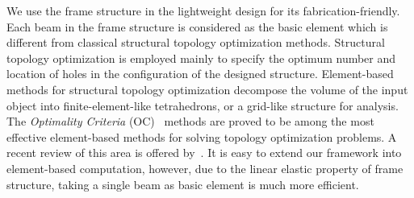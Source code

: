We use the frame structure in the lightweight design for its fabrication-friendly. Each beam in the frame structure is considered as the basic element which is different from classical structural topology optimization methods. Structural topology optimization is employed mainly to specify the optimum number and location of holes in the configuration of the designed structure.
Element-based methods for structural topology optimization decompose the volume of the input object into finite-element-like tetrahedrons, or a grid-like structure for analysis. The \emph{Optimality Criteria} (OC)~\cite{rozvany:1989} methods are proved to be among the most effective element-based methods for solving topology optimization problems. 
A recent review of this area is offered by~\cite{rozvany:2009}.
It is easy to extend our framework into element-based computation, however, due to the linear elastic property of frame structure, taking a single beam as basic element is much more efficient.
